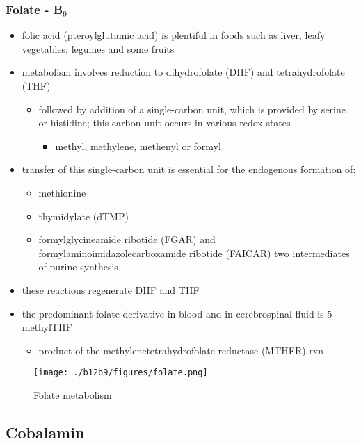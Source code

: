 \documentclass{scrartcl}
\begin{document}
\subsubsection{Folate - B\(_{\text{9}}\)}
\label{sec:org9cb3118}
\begin{itemize}
\item folic acid (pteroylglutamic acid) is plentiful in foods such as
liver, leafy vegetables, legumes and some fruits
\item metabolism involves reduction to dihydrofolate (DHF) and
tetrahydrofolate (THF)
\begin{itemize}
\item followed by addition of a single-carbon unit, which is provided by
serine or histidine; this carbon unit occurs in various redox
states
\begin{itemize}
\item methyl, methylene, methenyl or formyl
\end{itemize}
\end{itemize}
\item transfer of this single-carbon unit is essential for the endogenous
formation of:
\begin{itemize}
\item methionine
\item thymidylate (dTMP)
\item formylglycineamide ribotide (FGAR) and
formylaminoimidazolecarboxamide ribotide (FAICAR) two
intermediates of purine synthesis
\end{itemize}
\item these reactions regenerate DHF and THF
\item the predominant folate derivative in blood and in cerebrospinal
fluid is 5-methylTHF
\begin{itemize}
\item product of the methylenetetrahydrofolate reductase (MTHFR) rxn
\end{itemize}
\end{itemize}

\begin{figure}[htbp]
\centering
\texttt{[image: ./b12b9/figures/folate.png]}
\caption{\label{fig:orgba8bec9}
Folate metabolism}
\end{figure}

\subsection{Cobalamin}
\label{sec:orgc03bcf4}
\end{document}
